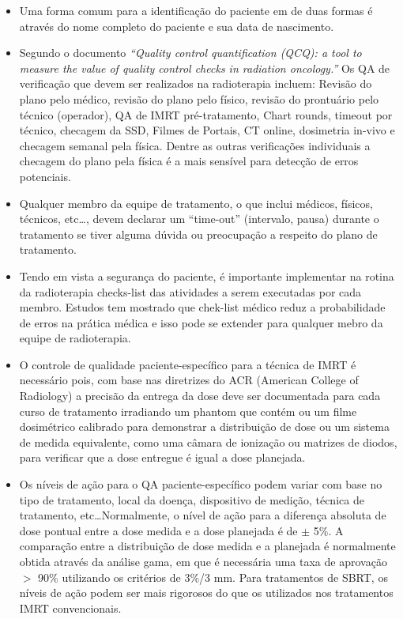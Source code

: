 \documentclass[11pt,a4paper]{article}
\newcounter{exemplo}
\begin{document}
\begin{exemplo}[11. Qualidade ]
\begin{itemize}
        \item Uma forma comum para a identificação do paciente em de duas formas é através do nome completo do paciente e sua data de nascimento.

        \item Segundo o documento \textit{``Quality control quantification (QCQ): a tool to measure the value of quality control checks in radiation oncology.''} Os QA de verificação que devem ser realizados na radioterapia incluem: Revisão do plano pelo médico, revisão do plano pelo físico, revisão do prontuário pelo técnico (operador), QA de IMRT pré-tratamento, Chart rounds, timeout por técnico, checagem da SSD, Filmes de Portais, CT online, dosimetria in-vivo e checagem semanal pela física. Dentre as outras verificações individuais a checagem do plano pela física é a mais sensível para detecção de erros potenciais.
        
        \item Qualquer membro da equipe de tratamento, o que inclui médicos, físicos, técnicos, etc\dots, devem declarar um ``time-out'' (intervalo, pausa) durante o tratamento  se tiver alguma dúvida ou preocupação a respeito do plano de tratamento.
        
        \item Tendo em vista a segurança do paciente, é importante implementar na rotina da radioterapia checks-list das atividades a serem executadas por cada membro. Estudos tem mostrado que chek-list médico reduz a probabilidade de erros na prática médica e isso pode se extender para qualquer mebro da equipe de radioterapia.
        
        \item O controle de qualidade paciente-específico para a técnica de IMRT é necessário pois, com base nas diretrizes do ACR (American College of Radiology) a precisão da entrega da dose deve ser documentada para cada curso de tratamento irradiando um phantom que contém ou um filme dosimétrico calibrado para demonstrar a distribuição de dose ou um sistema de medida equivalente, como uma câmara de ionização ou matrizes de diodos, para verificar que a dose entregue é igual a dose planejada.
        
        \item Os níveis de ação para o QA paciente-específico podem variar com base no tipo de tratamento, local da doença, dispositivo de medição, técnica de tratamento, etc\dots Normalmente, o nível de ação para a diferença absoluta de dose pontual entre a dose medida e a dose planejada é de $\pm$ 5\%. A comparação entre a distribuição de dose medida e a planejada é normalmente obtida através da análise gama, em que é necessária uma taxa de aprovação $>$ 90\% utilizando os critérios de 3\%/3 mm. Para tratamentos de SBRT, os níveis de ação podem ser mais rigorosos do que os utilizados nos tratamentos IMRT convencionais.
        

\end{itemize}
\end{exemplo}
\end{document}
